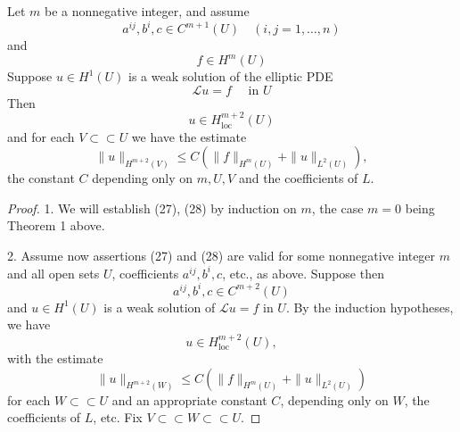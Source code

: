 \begin{theorem}
    Let $m$ be a nonnegative integer, and assume
    \begin{equation*}
        a^{i j}, b^i, c \in C^{m+1}(U) \quad(i, j=1, \ldots, n)
    \end{equation*}
    and
    \begin{equation*}
        f \in H^m(U)
    \end{equation*}
    Suppose $u \in H^1(U)$ is a weak solution of the elliptic PDE
    \begin{equation*}
        \mathcal{L}u=f \quad \text { in } U
    \end{equation*}
    Then
    \begin{equation*}
        u \in H_{\mathrm{loc}}^{m+2}(U)
    \end{equation*}
    and for each $V \subset \subset U$ we have the estimate
    \begin{equation*}
        \|u\|_{H^{m+2}(V)} \leq C\left(\|f\|_{H^m(U)}+\|u\|_{L^2(U)}\right),
    \end{equation*}
    the constant $C$ depending only on $m, U, V$ and the coefficients of $L$.

    \begin{proof}
        1.
        We will establish (27), (28) by induction on $m$, the case $m=0$ being Theorem 1 above.

        2. Assume now assertions (27) and (28) are valid for some nonnegative integer $m$ and all open sets $U$, coefficients $a^{i j}, b^i, c$, etc., as above. Suppose then
        \begin{equation*}
            a^{i j}, b^i, c \in C^{m+2}(U)
        \end{equation*}
        and $u \in H^1(U)$ is a weak solution of $\mathcal{L}u=f$ in $U$. By the induction hypotheses, we have
        \begin{equation*}
            u \in H_{\mathrm{loc}}^{m+2}(U),
        \end{equation*}
        with the estimate
        \begin{equation*}
            \|u\|_{H^{m+2}(W)} \leq C\left(\|f\|_{H^m(U)}+\|u\|_{L^2(U)}\right)
        \end{equation*}
        for each $W \subset \subset U$ and an appropriate constant $C$, depending only on $W$, the coefficients of $L$, etc. Fix $V \subset \subset W \subset \subset U$.


\end{proof}
\end{theorem}
